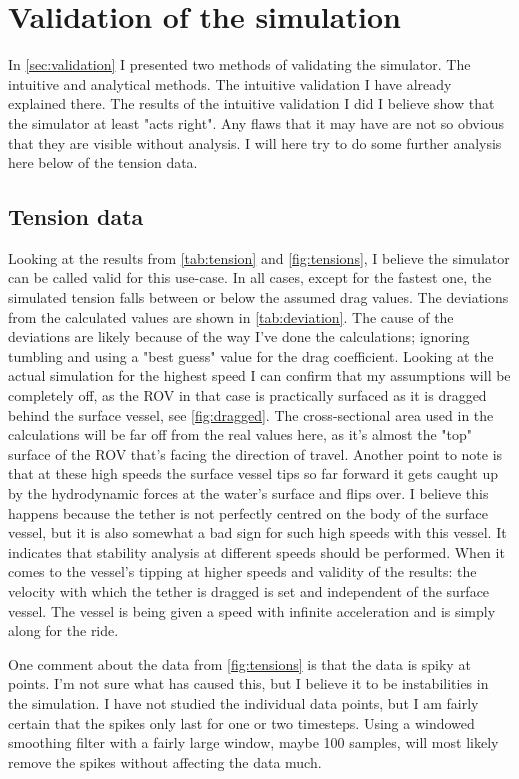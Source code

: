 \section{Validation of the simulation}
In \cref{sec:validation} I presented two methods of validating the simulator. The intuitive and analytical methods. The intuitive validation I have already explained there. The results of the intuitive validation I did I believe show that the simulator at least "acts right". Any flaws that it may have are not so obvious that they are visible without analysis. I will here try to do some further analysis here below of the tension data. 

\subsection{Tension data}
Looking at the results from \cref{tab:tension} and \cref{fig:tensions}, I believe the simulator can be called valid for this use-case. In all cases, except for the fastest one, the simulated tension falls between or below the assumed drag values.  The deviations from the calculated values are shown in \cref{tab:deviation}. The cause of the deviations are likely because of the way I've done the calculations; ignoring tumbling and using a "best guess" value for the drag coefficient. Looking at the actual simulation for the highest speed I can confirm that my assumptions will be completely off, as the ROV in that case is practically surfaced as it is dragged behind the surface vessel, see \cref{fig:dragged}. The cross-sectional area used in the calculations will be far off from the real values here, as it's almost the "top" surface of the ROV that's facing the direction of travel. Another point to note is that at these high speeds the surface vessel tips so far forward it gets caught up by the hydrodynamic forces at the water's surface and flips over. I believe this happens because the tether is not perfectly centred on the body of the surface vessel, but it is also somewhat a bad sign for such high speeds with this vessel. It indicates that stability analysis at different speeds should be performed. When it comes to the vessel's tipping at higher speeds and validity of the results: the velocity with which the tether is dragged is set and independent of the surface vessel. The vessel is being given a speed with infinite acceleration and is simply along for the ride.

\label{sec:spiky}
One comment about the data from \cref{fig:tensions} is that the data is spiky at points. I'm not sure what has caused this, but I believe it to be instabilities in the simulation. I have not studied the individual data points, but I am fairly certain that the spikes only last for one or two timesteps. Using a windowed smoothing filter with a fairly large window, maybe 100 samples, will most likely remove the spikes without affecting the data much. 

